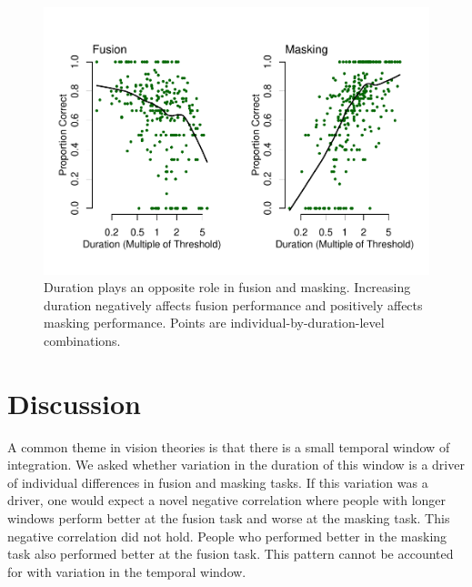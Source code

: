 \documentclass[
  ,man]{apa6}
\begin{document}
\begin{figure}[h]
\includegraphics{p_files/figure-latex/result2-1} \caption{Duration plays an opposite role in fusion and masking.  Increasing duration negatively affects fusion performance and positively affects masking performance.  Points are individual-by-duration-level combinations.}\label{fig:result2}
\end{figure}

\hypertarget{discussion}{%
\section{Discussion}\label{discussion}}

A common theme in vision theories is that there is a small temporal window of integration. We asked whether variation in the duration of this window is a driver of individual differences in fusion and masking tasks. If this variation was a driver, one would expect a novel negative correlation where people with longer windows perform better at the fusion task and worse at the masking task. This negative correlation did not hold. People who performed better in the masking task also performed better at the fusion task. This pattern cannot be accounted for with variation in the temporal window.
\end{document}
